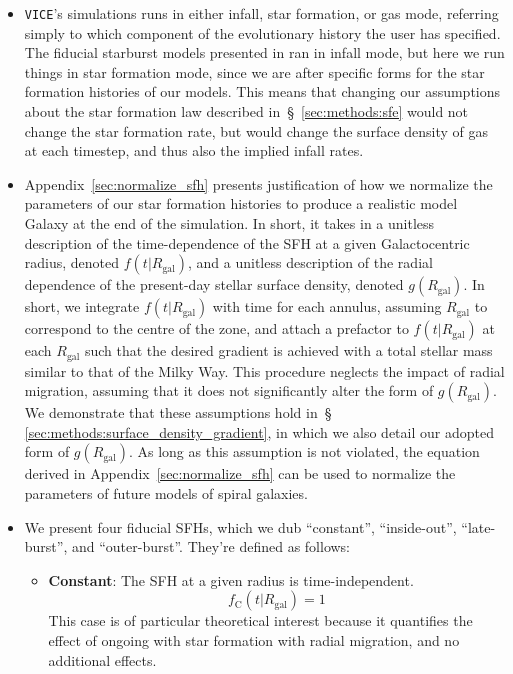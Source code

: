 \documentclass[fleqn, usenatbib]{mnras}
\begin{document}
\begin{itemize} 
	\item \texttt{VICE}'s simulations runs in either infall, star formation, or 
	gas mode, referring simply to which component of the evolutionary history 
	the user has specified. The fiducial starburst models presented in 
	\citet{Johnson2020} ran in infall mode, but here we run things in star 
	formation mode, since we are after specific forms for the star formation 
	histories of our models. This means that changing our assumptions about the 
	star formation law described in~\S~\ref{sec:methods:sfe} would not change 
	the star formation rate, but would change the surface density of gas at 
	each timestep, and thus also the implied infall rates. 

	\item Appendix~\ref{sec:normalize_sfh} presents justification of how we 
	normalize the parameters of our star formation histories to produce a 
	realistic model Galaxy at the end of the simulation. In short, it takes in 
	a unitless description of the time-dependence of the SFH at a given 
	Galactocentric radius, denoted $f(t|R_\text{gal})$, and a unitless 
	description of the radial dependence of the present-day stellar surface 
	density, denoted $g(R_\text{gal})$. In short, we integrate 
	$f(t|R_\text{gal})$ with time for each annulus, assuming $R_\text{gal}$ to 
	correspond to the centre of the zone, and attach a prefactor to 
	$f(t|R_\text{gal})$ at each $R_\text{gal}$ such that the desired gradient 
	is achieved with a total stellar mass similar to that of the Milky Way. 
	This procedure neglects the impact of radial migration, assuming that it 
	does not significantly alter the form of $g(R_\text{gal})$. We demonstrate 
	that these assumptions hold in~\S 
	\ref{sec:methods:surface_density_gradient}, in which we also detail our 
	adopted form of $g(R_\text{gal})$. As long as this assumption is not 
	violated, the equation derived in Appendix~\ref{sec:normalize_sfh} can be 
	used to normalize the parameters of future models of spiral galaxies. 

	\item We present four fiducial SFHs, which we dub ``constant'', 
	``inside-out'', ``late-burst'', and ``outer-burst''. They're defined as 
	follows: 
	\begin{itemize} 
		\item \textbf{Constant}: The SFH at a given radius is time-independent. 
		\begin{equation} 
		f_\text{C}(t|R_\text{gal}) = 1 
		\label{eq:constant_sfh} 
		\end{equation} 
		This case is of particular theoretical interest because it quantifies 
		the effect of ongoing with star formation with radial migration, and 
		no additional effects. 


\end{itemize}
\end{itemize}
\end{document}
